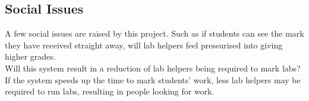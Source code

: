 \documentclass[12pt]{article}  %
\begin{document}


\subsection{Social Issues}
A few social issues are raised by this project. Such as if students can see the mark they have received straight away, will lab helpers feel pressurised into giving higher grades.\\
Will this system result in a reduction of lab helpers being required to mark labs? If the system speeds up the time to mark students’ work, less lab helpers may be required to run labs, resulting in people looking for work.







\newpage
\printbibliography[heading=bibintoc]
\end{document}
